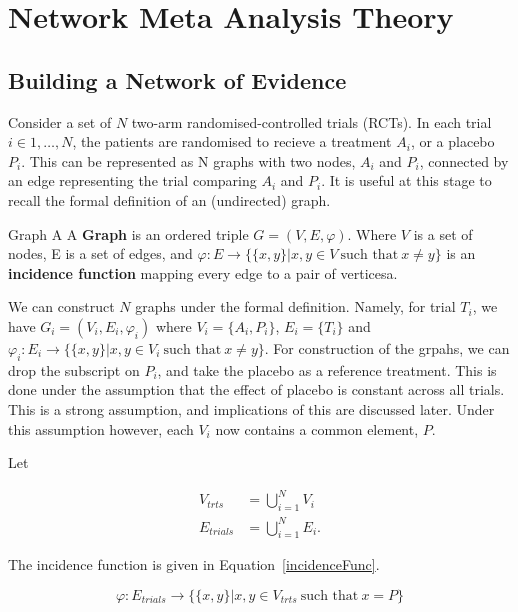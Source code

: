 \chapter{Network Meta Analysis Theory}\label{nmatheory}

\section{Building a Network of Evidence}

Consider a set of $N$ two-arm randomised-controlled trials (RCTs). In each trial $i \in 1,\ldots,N$, the patients are randomised to recieve a treatment $A_i$, or a placebo $P_i$. This can be represented as N graphs with two nodes, $A_i$ and $P_i$, connected by an edge representing the trial comparing $A_i$ and $P_i$. It is useful at this stage to recall the formal definition of an (undirected) graph. 

\begin{definition}{Graph}
A  A \textbf{Graph} is an ordered triple $G = (V, E, \varphi)$. Where  $V$ is a set of nodes, E is a set  of edges, and $\varphi : E \to \{\{ x, y \} | x, y \in V \ \text{such that} \ x \neq y \}$ is an  \textbf{incidence function} mapping every edge to a pair of verticesa.
\end{definition}

We can construct $N$ graphs under the formal definition. Namely, for trial $T_i$, we have $G_i = (V_i, E_i, \varphi_i)$ where $V_i = \{ A_i, P_i \}$, $E_i = \{T_i\}$ and $\varphi_i : E_i \to \{ \{ x, y \} | x, y \in V_i \ \text{such that} \  x \neq y \}$. For construction of the grpahs, we can drop the subscript on $P_i$, and take the placebo as a reference treatment. This is done under the assumption that the effect of placebo is constant across all trials. This is a strong assumption, and implications of this are discussed later. Under this assumption however, each $V_i$ now contains a common element, $P$.

Let

\begin{align*}
    V_{trts} &= \bigcup_{i=1}^{N} V_i \\
    E_{trials} &= \bigcup_{i=1}^{N} E_i
.\end{align*}

The incidence function is given in Equation~\ref{incidenceFunc}.

\begin{equation}
    \varphi : E_{trials} \to \{ \{x, y \} | x, y \in V_{trts} \ \text{such that} \ x = P \}
    \label{incidenceFunc}
\end{equation}

